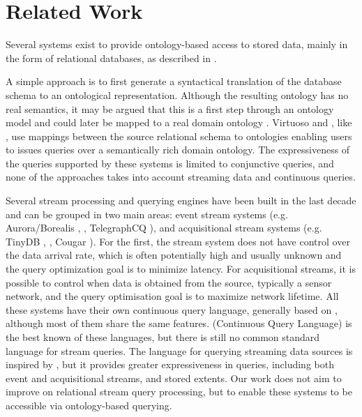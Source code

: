 \section{Related Work}
\label{sec:related-work}

Several systems exist to provide ontology-based access to stored data, mainly in the form of relational databases, as described in \cite{Sahoo_09}. 

A simple approach is to first generate a syntactical translation of the database schema to an ontological representation. 
Although the resulting ontology has no real semantics, it may be argued that this is a first step through an ontology model and could later be mapped to a real domain ontology \cite{Lubyte_09}.
Virtuoso \cite{Erling_07} and \dtworq  \cite{Bizer_07}, like \rtwoo, use mappings between the source relational schema to \rdf ontologies enabling users to issues queries over a semantically rich domain ontology.
The expressiveness of the queries supported by these systems is limited to conjunctive queries, and none of the approaches takes into account streaming data and continuous queries.

Several stream processing and querying engines have been built in the last decade and can be grouped in two main areas: event stream systems (e.g. Aurora/Borealis \cite{Abadi_2005}, \stream \cite{Arasu_06a}, TelegraphCQ \cite{Chandrasekaran_03}), and acquisitional stream systems (e.g. TinyDB \cite{Madden_05}, \snee \cite{Galpin_09}, Cougar \cite{Yao_02}). 
For the first, the stream system does not have control over the data arrival rate, which is often potentially high and usually unknown and the query optimization goal is to minimize latency. 
For acquisitional streams, it is possible to control when data is obtained from the source, typically a sensor network, and the query optimisation goal is to maximize network lifetime. 
All these systems have their own continuous query language, generally based on \sql, although most of them share the same features. 
\cql (Continuous Query Language) \cite{Arasu_2006} is the best known of these languages, but  there is still no common standard  language for stream queries. 
The \sneeql\cite{Brenninkmeijer_08} language for querying streaming data sources is inspired by \cql, but it provides greater expressiveness in queries, including both event and acquisitional streams, and stored extents.
Our work does not aim to improve on relational stream query processing, but to enable these systems to be accessible via ontology-based querying.

